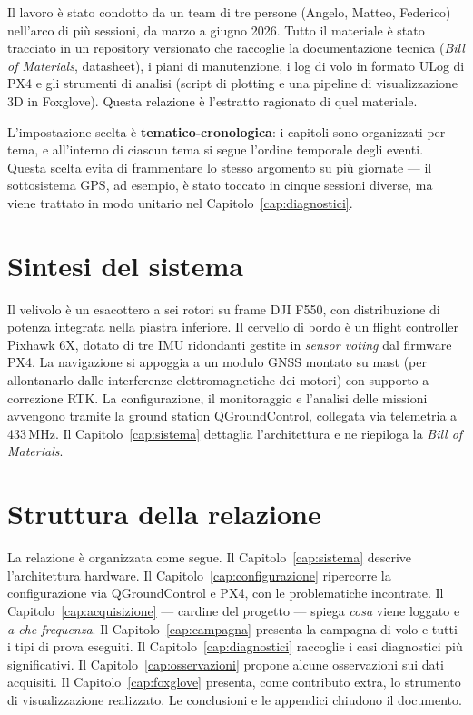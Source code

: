 Il lavoro \`e stato condotto da un team di tre persone (Angelo, Matteo,
Federico) nell'arco di pi\`u sessioni, da marzo a giugno 2026. Tutto il
materiale \`e stato tracciato in un repository versionato che raccoglie la
documentazione tecnica (\emph{Bill of Materials}, datasheet), i piani di
manutenzione, i log di volo in formato ULog di PX4 e gli strumenti di analisi
(script di plotting e una pipeline di visualizzazione 3D in Foxglove). Questa
relazione \`e l'estratto ragionato di quel materiale.

L'impostazione scelta \`e \textbf{tematico-cronologica}: i capitoli sono
organizzati per tema, e all'interno di ciascun tema si segue l'ordine
temporale degli eventi. Questa scelta evita di frammentare lo stesso argomento
su pi\`u giornate --- il sottosistema GPS, ad esempio, \`e stato toccato in
cinque sessioni diverse, ma viene trattato in modo unitario nel
Capitolo~\ref{cap:diagnostici}.

\section{Sintesi del sistema}

Il velivolo \`e un esacottero a sei rotori su frame DJI F550, con
distribuzione di potenza integrata nella piastra inferiore. Il cervello di
bordo \`e un flight controller Pixhawk 6X, dotato di tre IMU ridondanti
gestite in \emph{sensor voting} dal firmware PX4. La navigazione si appoggia a
un modulo GNSS montato su mast (per allontanarlo dalle interferenze
elettromagnetiche dei motori) con supporto a correzione RTK. La
configurazione, il monitoraggio e l'analisi delle missioni avvengono tramite
la ground station QGroundControl, collegata via telemetria a 433\,MHz.
Il Capitolo~\ref{cap:sistema} dettaglia l'architettura e ne riepiloga la
\emph{Bill of Materials}.


\section{Struttura della relazione}

La relazione \`e organizzata come segue. Il Capitolo~\ref{cap:sistema}
descrive l'architettura hardware. Il Capitolo~\ref{cap:configurazione} ripercorre
la configurazione via QGroundControl e PX4, con le problematiche incontrate. Il
Capitolo~\ref{cap:acquisizione} --- cardine del progetto --- spiega \emph{cosa}
viene loggato e \emph{a che frequenza}. Il Capitolo~\ref{cap:campagna} presenta
la campagna di volo e tutti i tipi di prova eseguiti. Il
Capitolo~\ref{cap:diagnostici} raccoglie i casi diagnostici pi\`u significativi.
Il Capitolo~\ref{cap:osservazioni} propone alcune osservazioni sui dati
acquisiti. Il Capitolo~\ref{cap:foxglove} presenta, come contributo extra, lo
strumento di visualizzazione realizzato. Le conclusioni e le appendici chiudono
il documento.
